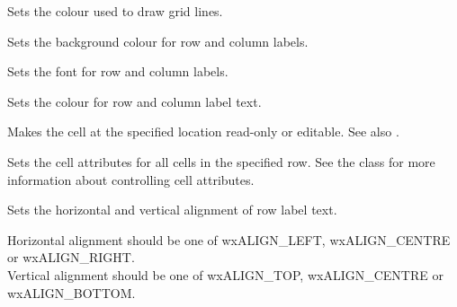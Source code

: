 {\label{wxgridsetgridlinecolour}


Sets the colour used to draw grid lines.

\label{wxgridsetlabelbackgroundcolour}


Sets the background colour for row and column labels.

\label{wxgridsetlabelfont}


Sets the font for row and column labels.

\label{wxgridsetlabeltextcolour}


Sets the colour for row and column label text.

\label{wxgridsetreadonly}


Makes the cell at the specified location read-only or editable.
See also .

\label{wxgridsetrowattr}


Sets the cell attributes for all cells in the specified row.
See the  class for more information
about controlling cell attributes.

\label{wxgridsetrowlabelalignment}


Sets the horizontal and vertical alignment of row label text.

Horizontal alignment should be one of wxALIGN_LEFT, wxALIGN_CENTRE or wxALIGN_RIGHT. \\
Vertical alignment should be one of wxALIGN_TOP, wxALIGN_CENTRE or wxALIGN_BOTTOM.

}
